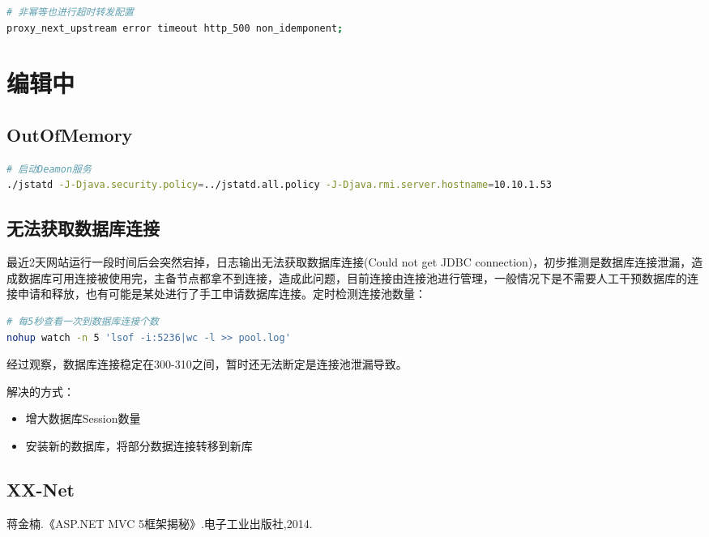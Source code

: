 \documentclass{book}
\begin{document}
\begin{lstlisting}[language=Bash]
# 非幂等也进行超时转发配置
proxy_next_upstream error timeout http_500 non_idemponent;
\end{lstlisting}

\section{编辑中}

\subsection{OutOfMemory}

\begin{lstlisting}[language=Bash]
# 启动Deamon服务
./jstatd -J-Djava.security.policy=../jstatd.all.policy -J-Djava.rmi.server.hostname=10.10.1.53
\end{lstlisting}




\subsection{无法获取数据库连接}

最近2天网站运行一段时间后会突然宕掉，日志输出无法获取数据库连接(Could not get JDBC connection)，初步推测是数据库连接泄漏，造成数据库可用连接被使用完，主备节点都拿不到连接，造成此问题，目前连接由连接池进行管理，一般情况下是不需要人工干预数据库的连接申请和释放，也有可能是某处进行了手工申请数据库连接。定时检测连接池数量：

\begin{lstlisting}[language=Bash]
# 每5秒查看一次到数据库连接个数
nohup watch -n 5 'lsof -i:5236|wc -l >> pool.log'
\end{lstlisting}

经过观察，数据库连接稳定在300-310之间，暂时还无法断定是连接池泄漏导致。



解决的方式：

\begin{itemize}
	\item{增大数据库Session数量}
	\item{安装新的数据库，将部分数据连接转移到新库}
\end{itemize}

\subsection{XX-Net}




\begin{thebibliography}{0}
蒋金楠.《ASP.NET MVC 5框架揭秘》.电子工业出版社,2014.
\end{thebibliography}

\end{document}
